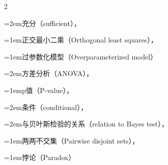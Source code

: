\begin{multicols}{2}
\par\noindent\hangindent=2em\hspace*{1em}\label{idx:738}充分（sufficient），\hyperref[exercise:6.8]{\pageref*{exercise:6.8}}\par
\par\addvspace{2pt}
\par\noindent\hangindent=1em\hspace*{0em}\label{idx:739}正交最小二乘（Orthogonal least squares），\hyperref[sec:12.2.2]{\pageref*{sec:12.2.2}}\par
\par\addvspace{2pt}
\par\noindent\hangindent=1em\hspace*{0em}\label{idx:740}过参数化模型（Overparameterized model）\par
\par\noindent\hangindent=2em\hspace*{1em}\label{idx:741}方差分析（ANOVA），\hyperref[eq:11.2.2]{\pageref*{eq:11.2.2}}\par
\par\addvspace{2pt}
\par\noindent\hangindent=1em\hspace*{0em}\label{idx:742}p值（P-value），\hyperref[def:8.3.26]{\pageref*{def:8.3.26}}\par
\par\noindent\hangindent=2em\hspace*{1em}\label{idx:743}条件（conditional），\hyperref[eq:8.3.10]{\pageref*{eq:8.3.10}}\par
\par\noindent\hangindent=2em\hspace*{1em}\label{idx:744}与贝叶斯检验的关系（relation to Bayes test），\hyperref[sec:8.5.3]{\pageref*{sec:8.5.3}}\par
\par\addvspace{2pt}
\par\noindent\hangindent=1em\hspace*{0em}\label{idx:745}两两不交集（Pairwise disjoint sets），\hyperref[def:1.1.5]{\pageref*{def:1.1.5}}\par
\par\addvspace{2pt}
\par\noindent\hangindent=1em\hspace*{0em}\label{idx:746}悖论（Paradox）\par

\end{multicols}
